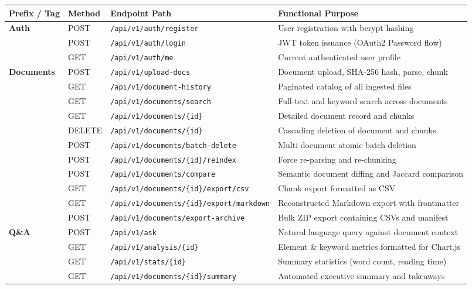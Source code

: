 \documentclass[11pt,a4paper]{article}
\begin{document}
\begin{table}[h!]
\centering
\small
\begin{tabularx}{\textwidth}{lllX}
\toprule
\textbf{Prefix / Tag} & \textbf{Method} & \textbf{Endpoint Path} & \textbf{Functional Purpose} \\
\midrule
\textbf{Auth} & POST & \texttt{/api/v1/auth/register} & User registration with bcrypt hashing \\
& POST & \texttt{/api/v1/auth/login} & JWT token issuance (OAuth2 Password flow) \\
& GET & \texttt{/api/v1/auth/me} & Current authenticated user profile \\
\midrule
\textbf{Documents} & POST & \texttt{/api/v1/upload-docs} & Document upload, SHA-256 hash, parse, chunk \\
& GET & \texttt{/api/v1/document-history} & Paginated catalog of all ingested files \\
& GET & \texttt{/api/v1/documents/search} & Full-text and keyword search across documents \\
& GET & \texttt{/api/v1/documents/\{id\}} & Detailed document record and chunks \\
& DELETE & \texttt{/api/v1/documents/\{id\}} & Cascading deletion of document and chunks \\
& POST & \texttt{/api/v1/documents/batch-delete} & Multi-document atomic batch deletion \\
& POST & \texttt{/api/v1/documents/\{id\}/reindex} & Force re-parsing and re-chunking \\
& POST & \texttt{/api/v1/documents/compare} & Semantic document diffing and Jaccard comparison \\
& GET & \texttt{/api/v1/documents/\{id\}/export/csv} & Chunk export formatted as CSV \\
& GET & \texttt{/api/v1/documents/\{id\}/export/markdown} & Reconstructed Markdown export with frontmatter \\
& POST & \texttt{/api/v1/documents/export-archive} & Bulk ZIP export containing CSVs and manifest \\
\midrule
\textbf{Q\&A} & POST & \texttt{/api/v1/ask} & Natural language query against document context \\
& GET & \texttt{/api/v1/analysis/\{id\}} & Element \& keyword metrics formatted for Chart.js \\
& GET & \texttt{/api/v1/stats/\{id\}} & Summary statistics (word count, reading time) \\
& GET & \texttt{/api/v1/documents/\{id\}/summary} & Automated executive summary and takeaways \\

\end{tabularx}
\end{table}
\end{document}

